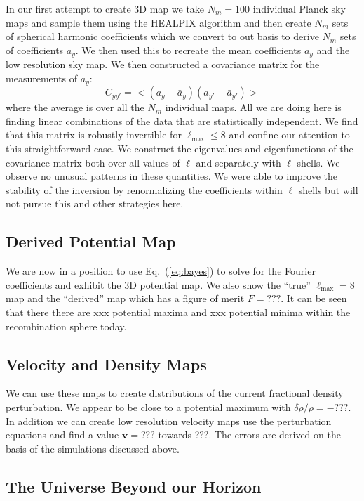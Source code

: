 \documentclass[useAMS,usenatbib,a4paper]{mn2e}
\begin{document}
In our first attempt to create 3D map we take $N_m=100$ individual
Planck sky maps and sample them using the HEALPIX algorithm and then
create $N_m$ sets of spherical harmonic coefficients which we convert
to out basis to derive $N_m$ sets of coefficients $a_y$. We then used
this to recreate the mean coefficients $\bar{a}_y$ and the low
resolution sky map. We then constructed a covariance matrix for the
measurements of $a_y$:
\begin{equation}
C_{yy'}=<(a_y-\bar{a}_y)(a_{y'}-\bar{a}_{y'})>
\end{equation}
where the average is over all the $N_m$ individual maps. All we are
doing here is finding linear combinations of the data that are
statistically independent. We find that this matrix is robustly
invertible for $\ell_\mathrm{max}\le8$ and confine our attention to
this straightforward case. We
construct the eigenvalues and eigenfunctions of the covariance matrix
both over all values of $\ell$ and separately with $\ell$ shells. We
observe no unusual patterns in these quantities. We were able to
improve the stability of the inversion by renormalizing the
coefficients within $\ell$ shells but will not pursue this and other
strategies here.

\subsection{Derived Potential Map}

We are now in a position to use Eq.~(\ref{eq:bayes}) to solve for the
Fourier coefficients and exhibit the 3D potential map. We also show
the ``true'' $\ell_\mathrm{max}=8$ map and the ``derived'' map which
has a figure of merit $F=???$.  It can be seen that there there are
xxx potential maxima and xxx potential minima within the recombination
sphere today.

\subsection{Velocity and Density Maps}

We can use these maps to create distributions of the current
fractional density perturbation. We appear to be close to a potential
maximum with $\delta\rho/\rho=-???$. In addition we can create low
resolution velocity maps use the perturbation equations and find a
value ${\mathbf v} =???$ towards ???. The errors are derived on the
basis of the simulations discussed above.

\subsection{The Universe Beyond our Horizon}
\end{document}
